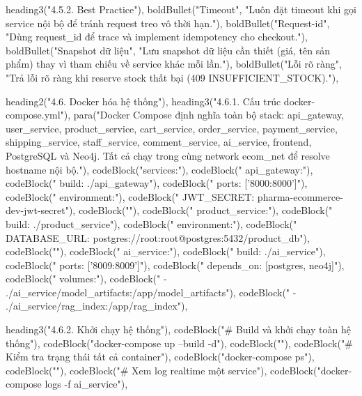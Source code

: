 {{{  heading3("4.5.2. Best Practice"),
  boldBullet("Timeout", "Luôn đặt timeout khi gọi service nội bộ để tránh request treo vô thời hạn."),
  boldBullet("Request-id", "Dùng request_id để trace và implement idempotency cho checkout."),
  boldBullet("Snapshot dữ liệu", "Lưu snapshot dữ liệu cần thiết (giá, tên sản phẩm) thay vì tham chiếu về service khác mỗi lần."),
  boldBullet("Lỗi rõ ràng", "Trả lỗi rõ ràng khi reserve stock thất bại (409 INSUFFICIENT_STOCK)."),

  heading2("4.6. Docker hóa hệ thống"),
  heading3("4.6.1. Cấu trúc docker-compose.yml"),
  para("Docker Compose định nghĩa toàn bộ stack: api_gateway, user_service, product_service, cart_service, order_service, payment_service, shipping_service, staff_service, comment_service, ai_service, frontend, PostgreSQL và Neo4j. Tất cả chạy trong cùng network ecom_net để resolve hostname nội bộ."),
  codeBlock("services:"),
  codeBlock("  api_gateway:"),
  codeBlock("    build: ./api_gateway"),
  codeBlock("    ports: ['8000:8000']"),
  codeBlock("    environment:"),
  codeBlock("      JWT_SECRET: pharma-ecommerce-dev-jwt-secret"),
  codeBlock(""),
  codeBlock("  product_service:"),
  codeBlock("    build: ./product_service"),
  codeBlock("    environment:"),
  codeBlock("      DATABASE_URL: postgres://root:root@postgres:5432/product_db"),
  codeBlock(""),
  codeBlock("  ai_service:"),
  codeBlock("    build: ./ai_service"),
  codeBlock("    ports: ['8009:8009']"),
  codeBlock("    depends_on: [postgres, neo4j]"),
  codeBlock("    volumes:"),
  codeBlock("      - ./ai_service/model_artifacts:/app/model_artifacts"),
  codeBlock("      - ./ai_service/rag_index:/app/rag_index"),

  heading3("4.6.2. Khởi chạy hệ thống"),
  codeBlock("# Build và khởi chạy toàn hệ thống"),
  codeBlock("docker-compose up --build -d"),
  codeBlock(""),
  codeBlock("# Kiểm tra trạng thái tất cả container"),
  codeBlock("docker-compose ps"),
  codeBlock(""),
  codeBlock("# Xem log realtime một service"),
  codeBlock("docker-compose logs -f ai_service"),

}}}
